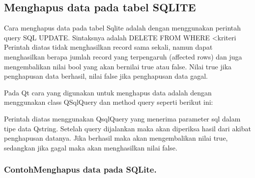 \subsection{Menghapus data pada tabel SQLITE}\label{menghapus-data-pada-tabel-sqlite}

Cara menghapus data pada tabel Sqlite adalah dengan menggunakan perintah
query SQL UPDATE. Sintaksnya adalah DELETE FROM WHERE \textless{}kriteri
Perintah diatas tidak menghasilkan record sama sekali, namun dapat
menghasilkan berapa jumlah record yang terpengaruh (affected rows) dan
juga mengembalikan nilai bool yang akan bernilai true atau false. Nilai
true jika penghapusan data berhasil, nilai false jika penghapusan data
gagal.

Pada Qt cara yang digunakan untuk menghapus data adalah dengan
menggunakan class QSqlQuery dan method query seperti berikut ini:



Perintah diatas menggunakan QsqlQuery yang menerima parameter sql dalam
tipe data Qstring. Setelah query dijalankan maka akan diperiksa hasil
dari akibat penghapusan datanya. Jika berhasil maka akan mengembalikan
nilai true, sedangkan jika gagal maka akan menghasilkan nilai false.

\subsubsection*{ContohMenghapus data pada SQLite.}


